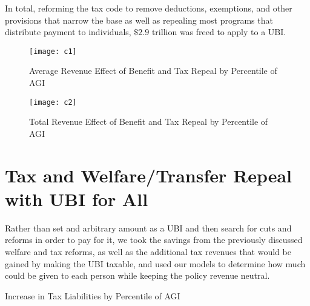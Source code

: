 \documentclass{article}
\begin{document}
In total, reforming the tax code to remove deductions, exemptions, and other provisions that narrow the base as well as repealing most programs that distribute payment to individuals, $\$2.9$ trillion was freed to apply to a UBI.

\begin{figure}[H]
\centering
\caption{Average Revenue Effect of Benefit and Tax Repeal by Percentile of AGI}
\texttt{[image: c1]}
\end{figure}

\begin{figure}[H]
\centering
\caption{Total Revenue Effect of Benefit and Tax Repeal by Percentile of AGI}
\texttt{[image: c2]}
\end{figure}



\section{Tax and Welfare/Transfer Repeal with UBI for All}

Rather than set and arbitrary amount as a UBI and then search for cuts and reforms in order to pay for it, we took the savings from the previously discussed welfare and tax reforms, as well as the additional tax revenues that would be gained by making the UBI taxable, and used our models to determine how much could be given to each person while keeping the policy revenue neutral.

\begin{table}[H]
\caption{Increase in Tax Liabilities by Percentile of AGI}
\begin{center}
\begin{adjustbox}{max width=\textwidth}

\end{adjustbox}
\end{center}
\end{table}
\end{document}
